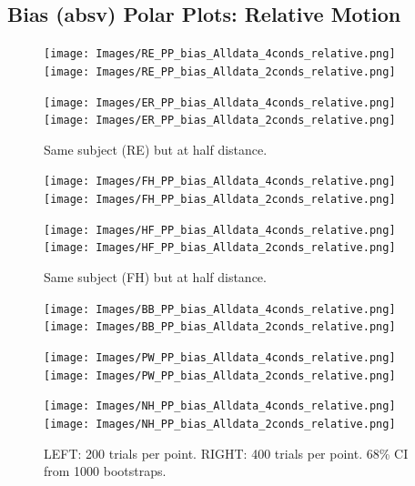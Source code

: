 \documentclass[11pt]{article} %
\begin{document}
\newpage
\subsection{Bias (absv) Polar Plots: Relative Motion}
\begin{figure}[H]
\centering %
\texttt{[image: Images/RE\_PP\_bias\_Alldata\_4conds\_relative.png]}
\texttt{[image: Images/RE\_PP\_bias\_Alldata\_2conds\_relative.png]}
\end{figure}
\begin{figure}[H]
\centering %
\texttt{[image: Images/ER\_PP\_bias\_Alldata\_4conds\_relative.png]}
\texttt{[image: Images/ER\_PP\_bias\_Alldata\_2conds\_relative.png]}
\caption{Same subject (RE) but at half distance.}
\end{figure}
\begin{figure}[H]
\centering %
\texttt{[image: Images/FH\_PP\_bias\_Alldata\_4conds\_relative.png]}
\texttt{[image: Images/FH\_PP\_bias\_Alldata\_2conds\_relative.png]}
\end{figure}
\begin{figure}[H]
\centering %
\texttt{[image: Images/HF\_PP\_bias\_Alldata\_4conds\_relative.png]}
\texttt{[image: Images/HF\_PP\_bias\_Alldata\_2conds\_relative.png]}
\caption{Same subject (FH) but at half distance.}
\end{figure}
\begin{figure}[H]
\centering %
\texttt{[image: Images/BB\_PP\_bias\_Alldata\_4conds\_relative.png]}
\texttt{[image: Images/BB\_PP\_bias\_Alldata\_2conds\_relative.png]}
\end{figure}
\begin{figure}[H]
\centering %
\texttt{[image: Images/PW\_PP\_bias\_Alldata\_4conds\_relative.png]}
\texttt{[image: Images/PW\_PP\_bias\_Alldata\_2conds\_relative.png]}
\end{figure}
\begin{figure}[H]
\centering %
\texttt{[image: Images/NH\_PP\_bias\_Alldata\_4conds\_relative.png]}
\texttt{[image: Images/NH\_PP\_bias\_Alldata\_2conds\_relative.png]}
\caption{LEFT: 200 trials per point. RIGHT: 400 trials per point. 68\% CI from 1000 bootstraps.}
\end{figure}
\end{document}
